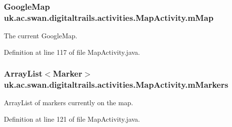 \hypertarget{classuk_1_1ac_1_1swan_1_1digitaltrails_1_1activities_1_1_map_activity_ad896b1298670b4e3492d5dcfe27842b3}{
\subsubsection[{m\+Map}]{\setlength{\rightskip}{0pt plus 5cm}Google\+Map uk.\+ac.\+swan.\+digitaltrails.\+activities.\+Map\+Activity.\+m\+Map\hspace{0.3cm}{\ttfamily [private]}}}\label{classuk_1_1ac_1_1swan_1_1digitaltrails_1_1activities_1_1_map_activity_ad896b1298670b4e3492d5dcfe27842b3}


The current Google\+Map. 



Definition at line 117 of file Map\+Activity.\+java.

\hypertarget{classuk_1_1ac_1_1swan_1_1digitaltrails_1_1activities_1_1_map_activity_a8791c1ad2e01e21fa9315567585e9d58}{
\subsubsection[{m\+Markers}]{\setlength{\rightskip}{0pt plus 5cm}Array\+List$<$Marker$>$ uk.\+ac.\+swan.\+digitaltrails.\+activities.\+Map\+Activity.\+m\+Markers\hspace{0.3cm}{\ttfamily [private]}}}\label{classuk_1_1ac_1_1swan_1_1digitaltrails_1_1activities_1_1_map_activity_a8791c1ad2e01e21fa9315567585e9d58}


Array\+List of markers currently on the map. 



Definition at line 121 of file Map\+Activity.\+java.

